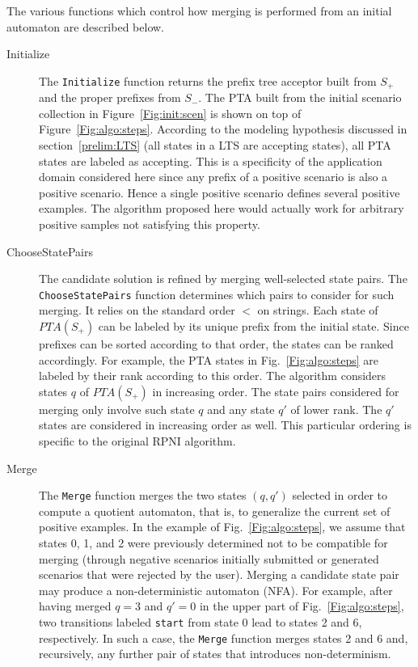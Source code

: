 The various functions which control how merging is performed from an initial automaton are described below. 

\begin{description}
\item[Initialize] The \texttt{Initialize} function returns the prefix tree acceptor built from $S_+$ and the proper prefixes from $S_-$. The PTA built from the initial scenario collection in Figure~\ref{Fig:init:scen} is shown on top of Figure~\ref{Fig:algo:steps}. According to the modeling hypothesis discussed in section~\ref{prelim:LTS} (all states in a LTS are accepting states), all PTA states are labeled as accepting. This is a specificity of the application domain considered here since any prefix of a positive scenario is also a positive scenario. Hence a single positive scenario defines several positive examples. The algorithm proposed here would actually work for arbitrary positive samples not satisfying this property.

\item[ChooseStatePairs] The candidate solution is refined by merging well-selected state pairs. The \texttt{ChooseStatePairs} function determines which pairs to consider for such merging. It relies on the standard order $<$ on strings. Each state of $PTA(S_+)$ can be labeled by its unique prefix from the initial state. Since prefixes can be sorted according to that order, the states can be ranked accordingly. For example, the PTA states in Fig.~\ref{Fig:algo:steps} are labeled by their rank according to this order. The algorithm considers states $q$ of $PTA(S_+)$ in increasing order. The state pairs considered for merging only involve such state $q$ and any state $q'$ of lower rank. The $q'$ states are considered in increasing order as well. This particular ordering is specific to the original RPNI algorithm.

\item[Merge] The \texttt{Merge} function merges the two states $(q, q')$ selected in order to compute a quotient automaton, that is, to generalize the current set of positive examples. In the example of Fig.~\ref{Fig:algo:steps}, we assume that states 0, 1, and 2 were previously determined not to be compatible for merging (through negative scenarios initially submitted or generated scenarios that were rejected by the user). Merging a candidate state pair may produce a non-deterministic automaton (NFA). For example, after having merged $q = 3$ and $q' = 0$ in the upper part of Fig.~\ref{Fig:algo:steps}, two transitions labeled \texttt{start} from state 0 lead to states 2 and 6, respectively. In such a case, the \texttt{Merge} function merges states 2 and 6 and, recursively, any further pair of states that introduces non-determinism. 


\end{description}
